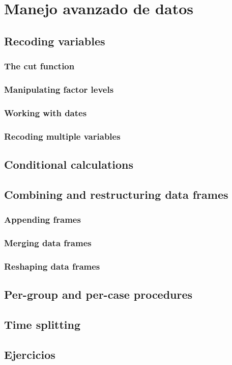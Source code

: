\chapter{Manejo avanzado de datos} \label{datosavanzados}
\section{Recoding variables}
\subsection{The cut function}
\subsection{Manipulating factor levels}
\subsection{Working with dates}
\subsection{Recoding multiple variables}
\section{Conditional calculations}
\section{Combining and restructuring data frames}
\subsection{Appending frames} \label{appending frames}
\subsection{Merging data frames}
\subsection{Reshaping data frames}
\section{Per-group and per-case procedures}
\section{Time splitting}
\section{Ejercicios}
